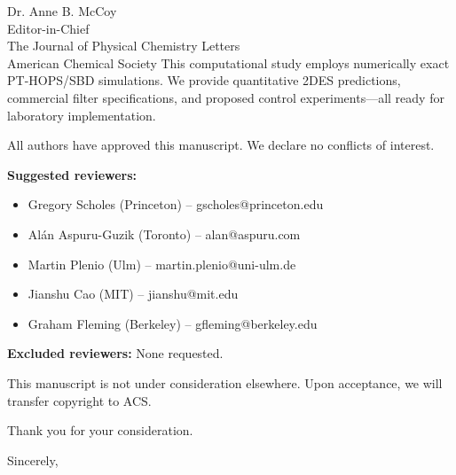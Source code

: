 \documentclass[11pt,a4paper]{letter}
\begin{document}
\begin{letter}{
Dr. Anne B. McCoy\\
Editor-in-Chief\\
The Journal of Physical Chemistry Letters\\
American Chemical Society
}
This computational study employs numerically exact PT-HOPS/SBD simulations. We provide quantitative 2DES predictions, commercial filter specifications, and proposed control experiments---all ready for laboratory implementation.

All authors have approved this manuscript. We declare no conflicts of interest.

\textbf{Suggested reviewers:}
\begin{itemize}
\item Gregory Scholes (Princeton) -- gscholes@princeton.edu
\item Alán Aspuru-Guzik (Toronto) -- alan@aspuru.com
\item Martin Plenio (Ulm) -- martin.plenio@uni-ulm.de
\item Jianshu Cao (MIT) -- jianshu@mit.edu
\item Graham Fleming (Berkeley) -- gfleming@berkeley.edu
\end{itemize}

\textbf{Excluded reviewers:} None requested.

This manuscript is not under consideration elsewhere. Upon acceptance, we will transfer copyright to ACS.

Thank you for your consideration.

\closing{Sincerely,}


\end{letter}
\end{document}
